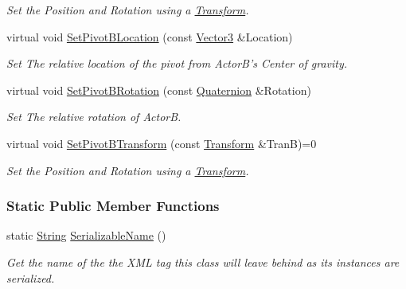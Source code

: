 \begin{DoxyCompactItemize}
\begin{DoxyCompactList}\small\item\em Set the Position and Rotation using a \hyperlink{classphys_1_1Transform}{Transform}. \item\end{DoxyCompactList}\item 
virtual void \hyperlink{classphys_1_1DualTransformConstraint_aa9e0ebd04572d18f344b701637270248}{SetPivotBLocation} (const \hyperlink{classphys_1_1Vector3}{Vector3} \&Location)
\begin{DoxyCompactList}\small\item\em Set The relative location of the pivot from ActorB's Center of gravity. \item\end{DoxyCompactList}\item 
virtual void \hyperlink{classphys_1_1DualTransformConstraint_a6eb22ee671ccc51c16f04c65e1a05a9e}{SetPivotBRotation} (const \hyperlink{classphys_1_1Quaternion}{Quaternion} \&Rotation)
\begin{DoxyCompactList}\small\item\em Set The relative rotation of ActorB. \item\end{DoxyCompactList}\item 
virtual void \hyperlink{classphys_1_1DualTransformConstraint_acda6a28b585c52fd7da1e79d85f4cf53}{SetPivotBTransform} (const \hyperlink{classphys_1_1Transform}{Transform} \&TranB)=0
\begin{DoxyCompactList}\small\item\em Set the Position and Rotation using a \hyperlink{classphys_1_1Transform}{Transform}. \item\end{DoxyCompactList}\end{DoxyCompactItemize}
\subsubsection*{Static Public Member Functions}
\begin{DoxyCompactItemize}
\item 
static \hyperlink{namespacephys_aa03900411993de7fbfec4789bc1d392e}{String} \hyperlink{classphys_1_1DualTransformConstraint_aea7ce65c759df1f3fc86d3f4a42d31d6}{SerializableName} ()
\begin{DoxyCompactList}\small\item\em Get the name of the the XML tag this class will leave behind as its instances are serialized. \item\end{DoxyCompactList}\end{DoxyCompactItemize}



